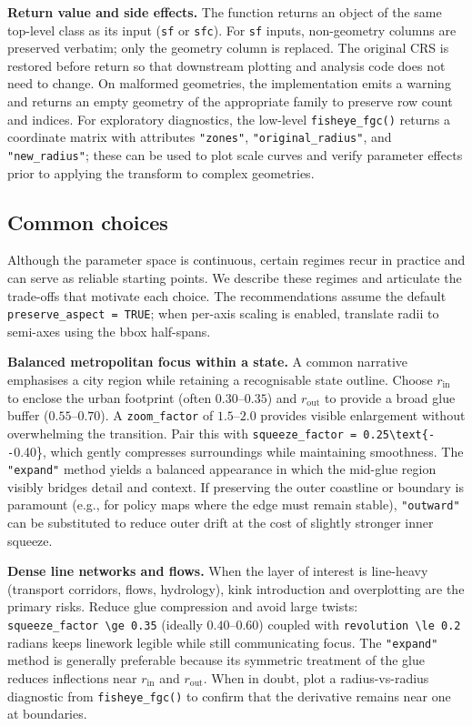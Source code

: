 \textbf{Return value and side effects.} The function returns an object of the same top-level class as
its input (\texttt{sf} or \texttt{sfc}). For \texttt{sf} inputs, non-geometry columns are preserved
verbatim; only the geometry column is replaced. The original CRS is restored before return so that
downstream plotting and analysis code does not need to change. On malformed geometries, the
implementation emits a warning and returns an empty geometry of the appropriate family to preserve
row count and indices. For exploratory diagnostics, the low-level \texttt{fisheye\_fgc()} returns a
coordinate matrix with attributes \texttt{"zones"}, \texttt{"original\_radius"}, and \texttt{"new\_radius"};
these can be used to plot scale curves and verify parameter effects prior to applying the transform
to complex geometries.

\hypertarget{common-choices}{%
\subsection{Common choices}\label{common-choices}}

Although the parameter space is continuous, certain regimes recur in practice and can serve as
reliable starting points. We describe these regimes and articulate the trade-offs that motivate each
choice. The recommendations assume the default \texttt{preserve\_aspect\ =\ TRUE}; when per-axis scaling is
enabled, translate radii to semi-axes using the bbox half-spans.

\textbf{Balanced metropolitan focus within a state.} A common narrative emphasises a city region while
retaining a recognisable state outline. Choose \(r_{\text{in}}\) to enclose the urban footprint (often
\(0.30\text{--}0.35\)) and \(r_{\text{out}}\) to provide a broad glue buffer
(\(0.55\text{--}0.70\)). A \texttt{zoom\_factor} of \(1.5\text{--}2.0\) provides visible enlargement
without overwhelming the transition. Pair this with \texttt{squeeze\_factor\ =\ 0.25\textbackslash{}text\{-\/-}0.40\}, which
gently compresses surroundings while maintaining smoothness. The \texttt{"expand"} method yields a
balanced appearance in which the mid-glue region visibly bridges detail and context. If preserving the
outer coastline or boundary is paramount (e.g., for policy maps where the edge must remain stable),
\texttt{"outward"} can be substituted to reduce outer drift at the cost of slightly stronger inner
squeeze.

\textbf{Dense line networks and flows.} When the layer of interest is line-heavy (transport corridors,
flows, hydrology), kink introduction and overplotting are the primary risks. Reduce glue compression
and avoid large twists: \texttt{squeeze\_factor\ \textbackslash{}ge\ 0.35} (ideally \(0.40\text{--}0.60\)) coupled with
\texttt{revolution\ \textbackslash{}le\ 0.2} radians keeps linework legible while still communicating focus. The
\texttt{"expand"} method is generally preferable because its symmetric treatment of the glue reduces
inflections near \(r_{\text{in}}\) and \(r_{\text{out}}\). When in doubt, plot a radius-vs-radius
diagnostic from \texttt{fisheye\_fgc()} to confirm that the derivative remains near one at boundaries.

